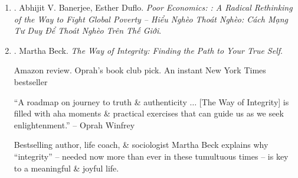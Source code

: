 \documentclass{article}
\begin{document}
\begin{enumerate}
\begin{itemize}
		\item {\sc Esther Duflo} won John Bates Clark medal last year for her work on development economics, so I was excited to read her new book with {\sc Abhijit Banerjee} {\it Poor Economics: A Radical Rethinking of the Way to Fight Global Poverty}. It's a good book. It doesn't really contain a radical rethinking of way to fight global poverty, but it does try to cut past lame debates over whether or not foreign aid ``works'' to instead attempt to find ways to actually assess which programs are working, which aren't, \& how to improve those that don't.'' -- {\sc Matthew Yglesias}, journalist
	\end{itemize}
	{\sf About Author.} {\sc Abhijit V. Banerjee} is Ford Foundation International Professor of Economics at the Massachusetts Institute of Technology. He lives in Cambridge, Massachusetts. {\sc Esther Duflo} is Abdul Latif Jameel Professor of Poverty Alleviation \& Development Economics in Department of Economics at Massachusetts Institute of Technology. She lives in Cambridge, Massachusetts. Together, they are winners of 2019 Nobel Prize in Economics \& coauthors of {\it Good Economics for Hard Times}. They have contributed to outlets as varied as {\it Nature}, NPR's {\it Planet Money}, {\it New York Times}, \& {\it Econometrica}, among others, \& are frequent contributors to French \& Indian press.
	
	\item \cite{Banerjee_Duflo_poor_economics_VN}. {\sc Abhijit V. Banerjee, Esther Duflo}. {\it Poor Economics: : A Radical Rethinking of the Way to Fight Global Poverty -- Hiểu Nghèo Thoát Nghèo: Cách Mạng Tư Duy Để Thoát Nghèo Trên Thế Giới}.\hfill{\sf[done]}
	
	\item \cite{Beck_integrity}. {\sc Martha Beck}. {\it The Way of Integrity: Finding the Path to Your True Self}. {}
	
	{\sf Amazon review.} {\sc Oprah}'s book club pick. An instant New York Times bestseller
	
	``A roadmap on journey to truth \& authenticity $\ldots$ [The Way of Integrity] is filled with aha moments \& practical exercises that can guide us as we seek enlightenment.'' -- {\sc Oprah Winfrey}
	
	Bestselling author, life coach, \& sociologist {\sc Martha Beck} explains why ``integrity'' -- needed now more than ever in these tumultuous times -- is key to a meaningful \& joyful life.
	

\end{enumerate}
\end{document}
